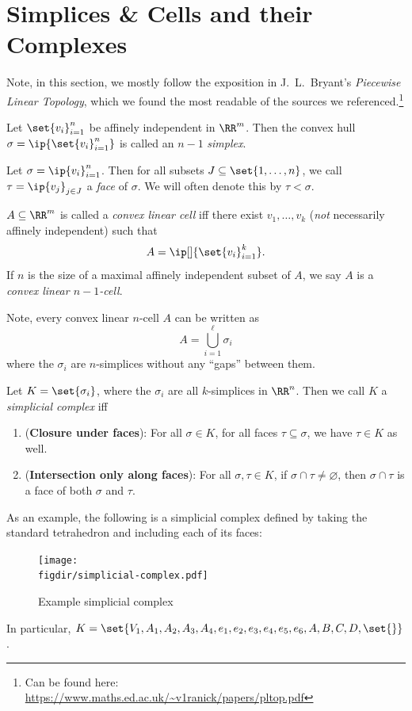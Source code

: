 \section{Simplices \& Cells and their Complexes}
Note, in this section, we mostly follow the exposition in J.\ L.\
Bryant's \emph{Piecewise Linear Topology}, which we found the most
readable of the sources we referenced.\footnote{Can be found here:
  \url{https://www.maths.ed.ac.uk/~v1ranick/papers/pltop.pdf}}

\begin{definition}[Simplex]
  Let $\set{v_i}_{i=1}^n$ be affinely independent in $\RR^m$. Then the
  convex hull $\sigma = \ip{\set{v_i}_{i=1}^n}$ is called an $n-1$
  \emph{simplex}.
\end{definition}
\begin{definition}[Face]
  Let $\sigma = \ip{v_i}_{i=1}^n$. Then for all subsets $J \subseteq
  \set{1, \ldots, n}$, we call $\tau = \ip{v_j}_{j\in J}$ a
  \emph{face} of $\sigma$. We will often denote this by $\tau
  <\sigma$.
\end{definition}
\begin{definition}
  $A \subseteq \RR^m$ is called a \emph{convex linear cell} iff
  there exist $v_1, \ldots, v_k$ (\emph{not} necessarily affinely
  independent) such that
  \[
    A = \ip[]{\set{v_i}_{i=1}^k}.
  \]
  If $n$ is the size of a maximal affinely independent subset of
  $A$, we say $A$ is a \emph{convex linear $n-1$-cell}.
\end{definition}
\begin{remark}
  Note, every convex linear $n$-cell $A$ can be written as
  \[
    A = \bigcup_{i=1}^{\ell} \sigma_i
  \]
  where the $\sigma_i$ are $n$-simplices without any ``gaps''
  between them.
\end{remark}



\begin{definition}
  Let $K = \set{\sigma_i}$, where the $\sigma_i$ are all $k$-simplices
  in $\RR^n$. Then we call $K$ a \emph{simplicial complex} iff
  \begin{enumerate}[label=(\arabic*)]
    \item (\textbf{Closure under faces}): For all $\sigma \in K$, for
      all faces $\tau \subseteq \sigma$, we have $\tau \in K$ as well.
    \item (\textbf{Intersection only along faces}): For all $\sigma,
      \tau \in K$, if $\sigma \cap \tau \neq \varnothing$, then
      $\sigma \cap \tau$ is a face of both $\sigma$ and $\tau$.
      \qedhere
  \end{enumerate}
\end{definition}
As an example, the following is a simplicial complex defined by taking
the standard tetrahedron and including each of its faces:
\begin{figure}[H]
  \centering
  \texttt{[image: \\figdir/simplicial-complex.pdf]}
  \caption{Example simplicial complex}
\end{figure}
In particular, $K = \set{V_1, A_1, A_2, A_3, A_4, e_1, e_2, e_3, e_4,
  e_5, e_6, A, B, C, D, \set{}}$.

